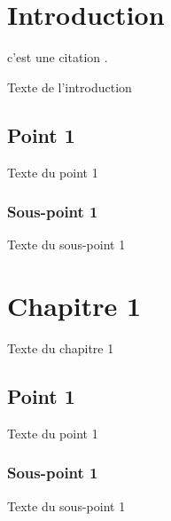 \documentclass{ULBreport}
\begin{document}

\chapter{Introduction}

c'est une citation \cite{Exemple}.

Texte de l'introduction
\section{Point 1}
Texte du point 1
\subsection{Sous-point 1}
Texte du sous-point 1

\chapter{Chapitre 1}
Texte du chapitre 1
\section{Point 1}
Texte du point 1
\subsection{Sous-point 1}
Texte du sous-point 1
\nocite{*}
\printbibliography[type=article,title=Articles]
\end{document}
